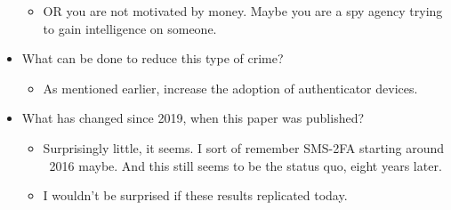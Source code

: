 \documentclass[11pt]{article}
\begin{document}
\begin{itemize}
\begin{itemize}
        \item OR you are not motivated by money. Maybe you are a spy agency trying to gain intelligence on someone.
    \end{itemize}
    \item What can be done to reduce this type of crime?
    \begin{itemize}
        \item As mentioned earlier, increase the adoption of authenticator devices. 
    \end{itemize}
    \item What has changed since 2019, when this paper was published?
    \begin{itemize}
        \item Surprisingly little, it seems. I sort of remember SMS-2FA starting around ~2016 maybe. And this still seems to be the status quo, eight years later. 
        \item I wouldn't be surprised if these results replicated today. 
    \end{itemize}
\end{itemize}
\end{document}
